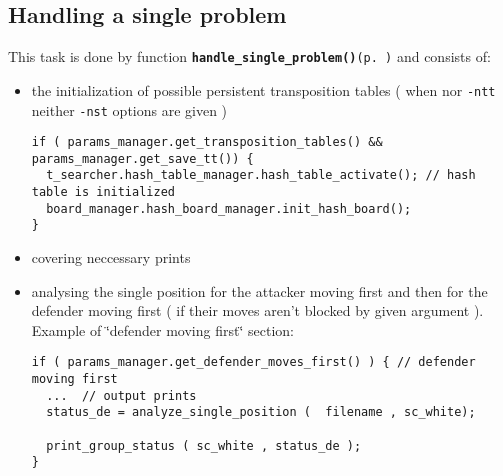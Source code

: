 \subsection{Handling a single problem}\label{page_2_page_2__sec_2}
This task is done by function {\tt {\bf handle\_\-single\_\-problem()}{\rm (p.\,\pageref{main_8cc_a3})}} and consists of:\begin{itemize}
\item the initialization of possible persistent transposition tables ( when nor {\tt -ntt} neither {\tt -nst} options are given ) 

\footnotesize\begin{verbatim}if ( params_manager.get_transposition_tables() && params_manager.get_save_tt()) { 
  t_searcher.hash_table_manager.hash_table_activate(); // hash table is initialized
  board_manager.hash_board_manager.init_hash_board();   
}
\end{verbatim}
\normalsize
\item covering neccessary prints\item analysing the single position for the attacker moving first and then for the defender moving first ( if their moves aren't blocked by given argument ). Example of \char`\"{}defender moving first\char`\"{} section: 

\footnotesize\begin{verbatim}if ( params_manager.get_defender_moves_first() ) { // defender moving first 
  ...  // output prints
  status_de = analyze_single_position (  filename , sc_white);

  print_group_status ( sc_white , status_de );
}
\end{verbatim}
\normalsize
\end{itemize}
